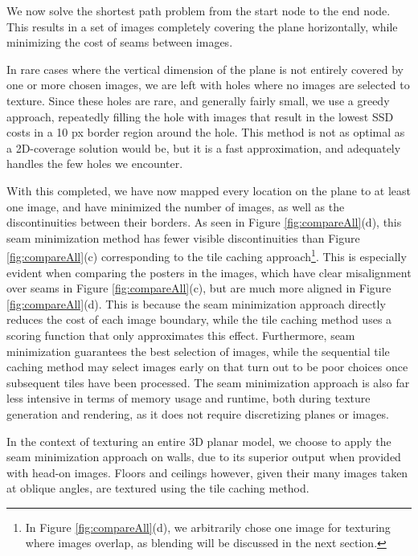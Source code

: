 \documentclass[]{spie}  %
\begin{document}
We now solve the shortest path problem from the start node to the end
node. This results in a set of images completely covering the plane
horizontally, while minimizing the cost of seams between images.

In rare cases where the vertical dimension of the plane is not
entirely covered by one or more chosen images, we are left with holes
where no images are selected to texture. Since these holes are rare,
and generally fairly small, we use a greedy approach, repeatedly
filling the hole with images that result in the lowest SSD costs in a
10 px border region around the hole. This method is not as optimal as
a 2D-coverage solution would be, but it is a fast approximation, and
adequately handles the few holes we encounter.

With this completed, we have now mapped every location on the plane to
at least one image, and have minimized the number of images, as well
as the discontinuities between their borders. As seen in Figure
\ref{fig:compareAll}(d), this seam minimization method has fewer
visible discontinuities than Figure \ref{fig:compareAll}(c)
corresponding to the tile caching approach\footnote{In Figure
  \ref{fig:compareAll}(d), we arbitrarily chose one image for
  texturing where images overlap, as blending will be discussed in the
  next section.}. This is especially evident when comparing the
posters in the images, which have clear misalignment over seams in
Figure \ref{fig:compareAll}(c), but are much more aligned in Figure
\ref{fig:compareAll}(d). This is because the seam minimization
approach directly reduces the cost of each image boundary, while the
tile caching method uses a scoring function that only approximates
this effect. Furthermore, seam minimization guarantees the best
selection of images, while the sequential tile caching method may
select images early on that turn out to be poor choices once
subsequent tiles have been processed. The seam minimization approach
is also far less intensive in terms of memory usage and runtime, both
during texture generation and rendering, as it does not require
discretizing planes or images.

In the context of texturing an entire 3D planar model, we choose to
apply the seam minimization approach on walls, due to its superior
output when provided with head-on images. Floors and ceilings however,
given their many images taken at oblique angles, are textured using
the tile caching method.

\end{document}
